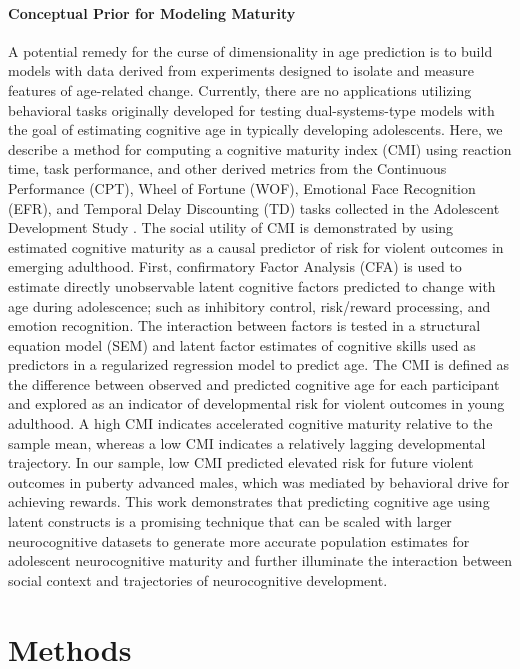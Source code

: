 \documentclass{article}%
\begin{document}
\paragraph*{Conceptual Prior for Modeling Maturity} A potential remedy for the curse of dimensionality in age prediction is to build models with data derived from experiments designed to isolate and measure features of age-related change. Currently, there are no applications utilizing behavioral tasks originally developed for testing dual-systems-type models with the goal of estimating cognitive age in typically developing adolescents. Here, we describe a method for computing a cognitive maturity index (CMI) using reaction time, task performance, and other derived metrics from the Continuous Performance (CPT), Wheel of Fortune (WOF), Emotional Face Recognition (EFR), and Temporal Delay Discounting (TD) tasks collected in the Adolescent Development Study \citep{Fishbein2016}. The social utility of CMI is demonstrated by using estimated cognitive maturity as a causal predictor of risk for violent outcomes in emerging adulthood. First, confirmatory Factor Analysis (CFA) is used to estimate directly unobservable latent cognitive factors predicted to change with age during adolescence; such as inhibitory control, risk/reward processing, and emotion recognition. The interaction between factors is tested in a structural equation model (SEM) and latent factor estimates of cognitive skills used as predictors in a regularized regression model to predict age. The CMI is defined as the difference between observed and predicted cognitive age for each participant and explored as an indicator of developmental risk for violent outcomes in young adulthood. A high CMI indicates accelerated cognitive maturity relative to the sample mean, whereas a low CMI indicates a relatively lagging developmental trajectory. In our sample, low CMI predicted elevated risk for future violent outcomes in puberty advanced males, which was mediated by behavioral drive for achieving rewards. This work demonstrates that predicting cognitive age using latent constructs is a promising technique that can be scaled with larger neurocognitive datasets to  generate more accurate population estimates for adolescent neurocognitive maturity and further illuminate the interaction between social context and trajectories of neurocognitive development. 
\section*{Methods}
\end{document}
